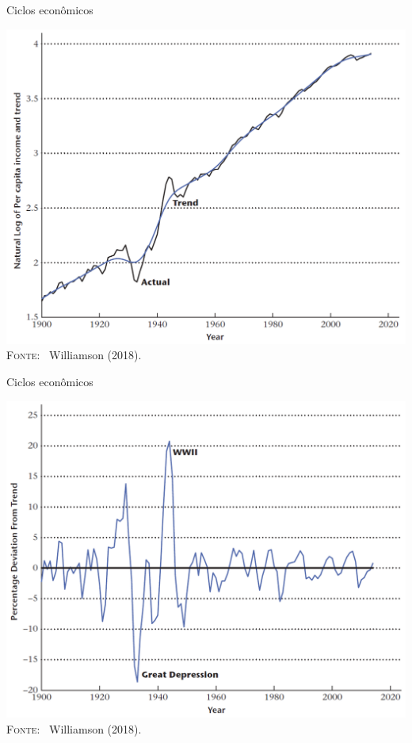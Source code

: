 \documentclass[10pt]{beamer}
\begin{document}
\begin{frame}{Ciclos econômicos}
    \begin{center}
        \begin{minipage}[b]{.6\textwidth}
            \includegraphics[width=\textwidth]{./figures/gdp decomp.PNG}
            \tiny{{\scshape Fonte}: \ Williamson (2018).}
        \end{minipage}
    \end{center}
\end{frame}

\begin{frame}{Ciclos econômicos}
    \begin{center}
        \begin{minipage}[b]{.58\textwidth}
            \includegraphics[width=\textwidth]{./figures/ciclo.PNG}
            \tiny{{\scshape Fonte}: \ Williamson (2018).}
        \end{minipage}
    \end{center}
\end{frame}
\end{document}
